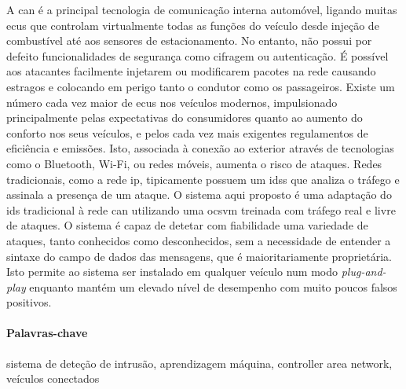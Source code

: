 \glsresetall
A \gls{can} é a principal tecnologia de comunicação interna automóvel, ligando muitas \glspl{ecu} que controlam virtualmente todas as funções do veículo desde injeção de combustível até aos sensores de estacionamento. No entanto, não possui por defeito funcionalidades de segurança como cifragem ou autenticação. É possível aos atacantes facilmente injetarem ou modificarem pacotes na rede causando estragos e colocando em perigo tanto o condutor como os passageiros. Existe um número cada vez maior de \glspl{ecu} nos veículos modernos, impulsionado principalmente pelas expectativas do consumidores quanto ao aumento do conforto nos seus veículos, e pelos cada vez mais exigentes regulamentos de eficiência e emissões. Isto, associada à conexão ao exterior através de tecnologias como o Bluetooth, Wi-Fi, ou redes móveis, aumenta o risco de ataques. Redes tradicionais, como a rede \gls{ip}, tipicamente possuem um \glspl{ids} que analiza o tráfego e assinala a presença de um ataque. O sistema aqui proposto é uma adaptação do \gls{ids} tradicional à rede \gls{can} utilizando uma \gls{ocsvm} treinada com tráfego real e livre de ataques. O sistema é capaz de detetar com fiabilidade uma variedade de ataques, tanto conhecidos como desconhecidos, sem a necessidade de entender a sintaxe do campo de dados das mensagens, que é maioritariamente proprietária. Isto permite ao sistema ser instalado em qualquer veículo num modo \textit{plug-and-play} enquanto mantém um elevado nível de desempenho com muito poucos falsos positivos.

\paragraph{Palavras-chave} sistema de deteção de intrusão, aprendizagem máquina, controller area network, veículos conectados